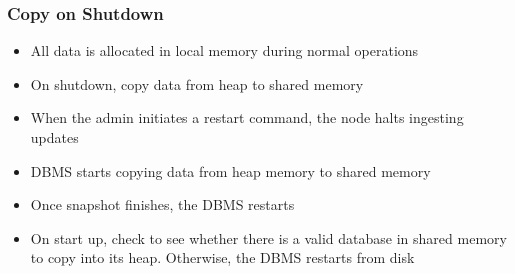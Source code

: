 \documentclass[11pt]{article}
\begin{document}
        \subsubsection*{Copy on Shutdown}
        \begin{itemize}
            \item All data is allocated in local memory during normal operations
            \item On shutdown, copy data from heap to shared memory
            \item When the admin initiates a restart command, the node halts ingesting updates
            \item DBMS starts copying data from heap memory to shared memory
            \item Once snapshot finishes, the DBMS restarts
            \item On start up, check to see whether there is a valid database in shared memory to copy into its heap. Otherwise, the DBMS restarts from disk
        \end{itemize}


\newpage


\end{document}
